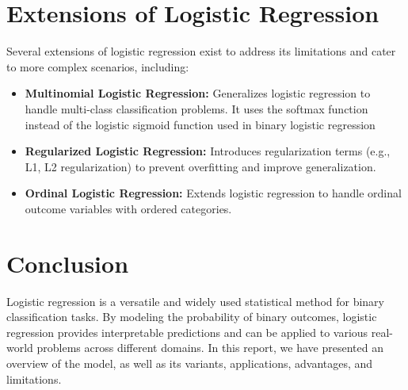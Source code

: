 \documentclass{article}
\begin{document}
\section{Extensions of Logistic Regression}
Several extensions of logistic regression exist to address its limitations and cater to more complex scenarios, including:
\begin{itemize}
    \item \textbf{Multinomial Logistic Regression:} Generalizes logistic regression to handle multi-class classification problems. It uses the softmax function instead of the logistic sigmoid function used in binary logistic regression
    \item \textbf{Regularized Logistic Regression:} Introduces regularization terms (e.g., L1, L2 regularization) to prevent overfitting and improve generalization.
    \item \textbf{Ordinal Logistic Regression:} Extends logistic regression to handle ordinal outcome variables with ordered categories.
\end{itemize}

\section{Conclusion}
Logistic regression is a versatile and widely used statistical method for binary classification tasks. By modeling the probability of binary outcomes, logistic regression provides interpretable predictions and can be applied to various real-world problems across different domains. In this report, we have presented an overview of the model, as well as its variants, applications, advantages, and limitations.
\end{document}
